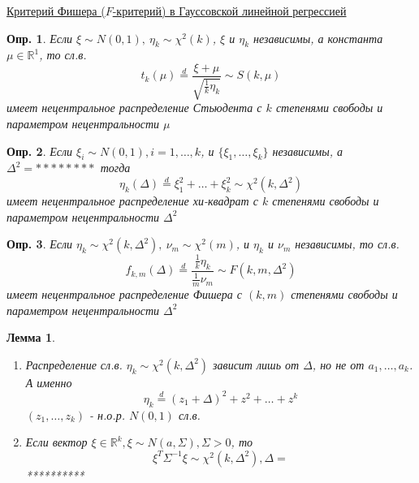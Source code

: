 \documentclass[12pt]{article}
\newtheorem{definition}{Опр.}
\newtheorem{lemma}{Лемма}
\theoremstyle{basic_theorem}
\theoremstyle{name_theorem}
\def\R{
    \mathbb{R}
}
\begin{document}
    \underline{Критерий Фишера ($F$-критерий) в Гауссовской линейной регрессией}
\begin{definition}
        Если $\xi\sim N(0,1),\ \eta_k\sim\chi^2(k)$, $\xi$ и $\eta_k$
        независимы, а константа $\mu\in\R^1$, то сл.в.
        $$t_k(\mu)\overset{d}{=}\frac{\xi+\mu}{\sqrt{\frac{1}{k}\eta_k}}\sim S(k,\mu)$$
        имеет нецентральное распределение Стьюдента с $k$ степенями свободы
        и параметром нецентральности $\mu$
\end{definition}
\begin{definition}
    Если $\xi_i\sim N(0,1),i=1,\ldots,k$, и $\{\xi_1,\ldots,\xi_k\}$
    независимы, а $\Delta^2=********$ тогда
    $$\eta_k(\Delta)\overset{d}{=}\xi_1^2+\ldots+\xi_k^2\sim\chi^2(k,\Delta^2)$$
    имеет нецентральное распределение хи-квадрат с $k$ степенями свободы
    и параметром нецентральности $\Delta^2$
\end{definition}
\begin{definition}
    Если $\eta_k\sim\chi^2(k,\Delta^2),\ \nu_m\sim\chi^2(m)$, и $\eta_k$ и $\nu_m$
    независимы, то сл.в.
    $$f_{k,m}(\Delta)\overset{d}{=}\frac{\frac{1}{k}\eta_k}{\frac{1}{m}\nu_m}\sim F(k,m,\Delta^2)$$
    имеет нецентральное распределение Фишера с $(k,m)$ степенями свободы и параметром
    нецентральности $\Delta^2$
\end{definition}
\begin{lemma}
    \begin{enumerate}
        \item Распределение сл.в. $\eta_k\sim\chi^2(k,\Delta^2)$ зависит лишь
            от $\Delta$, но не от $a_1,\ldots,a_k$. А именно
            $$\eta_k\overset{d}{=}(z_1+\Delta)^2+z^2+\ldots+z^k$$
            $(z_1,\ldots,z_k)$ - н.о.р. $N(0,1)$ сл.в.
        \item Если вектор $\xi\in\R^k,\xi\sim N(a, \Sigma),\Sigma>0$, то
        $$\xi^T\Sigma^{-1}\xi\sim\chi^2(k,\Delta^2),\Delta=$$ 
        **********
    \end{enumerate}
\end{lemma}
\end{document}

